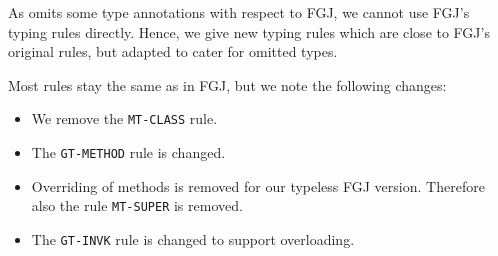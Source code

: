 As \TFGJ omits some type annotations with respect to FGJ, we cannot use
FGJ's typing rules directly. Hence, we give new typing rules which are
close to FGJ's original rules, but adapted to cater for omitted types.



Most rules stay the same as in FGJ, but we note the following changes:
\begin{itemize}
\item We remove the \texttt{MT-CLASS} rule.
\item The \texttt{GT-METHOD} rule is changed.
\item Overriding of methods is removed for our typeless FGJ version. Therefore also the rule \texttt{MT-SUPER} is removed.
\item The \texttt{GT-INVK} rule is changed to support overloading.
\end{itemize}

